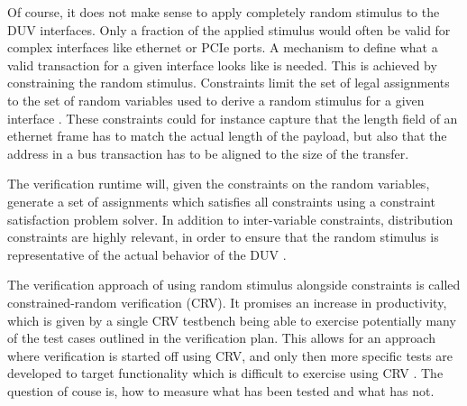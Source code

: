 \documentclass[11pt,a4paper]{report}
\begin{document}
Of course, it does not make sense to apply completely random stimulus to the DUV interfaces. Only a fraction of the
applied stimulus would often be valid for complex interfaces like ethernet or PCIe ports. A mechanism to define what
a valid transaction for a given interface looks like is needed. This is achieved by constraining the random stimulus.
Constraints limit the set of legal assignments to the set of random variables used to derive a random stimulus for a
given interface \cite[Ch. 3]{bergeron2012writing}. These constraints could for instance capture that the length field
of an ethernet frame has to match the actual length of the payload, but also that the address in a bus transaction
has to be aligned to the size of the transfer.

The verification runtime will, given the constraints on the random variables, generate a set of assignments which
satisfies all constraints using a constraint satisfaction problem solver. In addition to inter-variable
constraints, distribution constraints are highly relevant,
in order to ensure that the random stimulus is representative of the actual behavior of the DUV \cite[Sec. 7.5]{flake2020a}.

The verification approach of using random stimulus alongside constraints is called constrained-random verification
(CRV). It promises an increase in productivity, which is given by a single CRV testbench being able to exercise
potentially many of the test cases outlined in the verification plan. This allows for an approach where verification
is started off using CRV, and only then more specific tests are developed to target functionality which is difficult
to exercise using CRV \cite[Ch. 3]{bergeron2012writing}. The question of couse is, how to measure what has been
tested and what has not.

\end{document}
